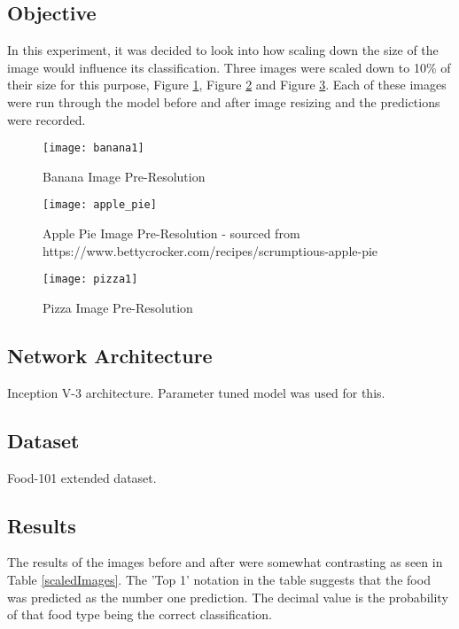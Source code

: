 \tocless\subsection{Objective}
In this experiment, it was decided to look into how scaling down the size of the image would influence its classification. Three images were scaled down to 10\% of their size for this purpose, Figure \ref{fig:bananaPreRes}, Figure \ref{fig:apple_piePreRes} and Figure \ref{fig:pizzaPreRes}. Each of these images were run through the model before and after image resizing and the predictions were recorded.

\begin{figure}
	\centering
    \texttt{[image: banana1]}
    \caption{Banana Image Pre-Resolution}
    \label{fig:bananaPreRes}
\end{figure}

\begin{figure}
	\centering
    \texttt{[image: apple\_pie]}
    \caption{Apple Pie Image Pre-Resolution - sourced from https://www.bettycrocker.com/recipes/scrumptious-apple-pie}
    \label{fig:apple_piePreRes}
\end{figure}

\begin{figure}	
	\centering
    \texttt{[image: pizza1]}
    \caption{Pizza Image Pre-Resolution}
    \label{fig:pizzaPreRes}
\end{figure}

\tocless\subsection{Network Architecture}
Inception V-3 architecture. Parameter tuned model was used for this.

\tocless\subsection{Dataset}
Food-101 extended dataset.

\tocless\subsection{Results}
The results of the images before and after were somewhat contrasting as seen in Table \ref{scaledImages}.
The 'Top 1' notation in the table suggests that the food was predicted as the number one prediction. The decimal value is the probability of that food type being the correct classification.

